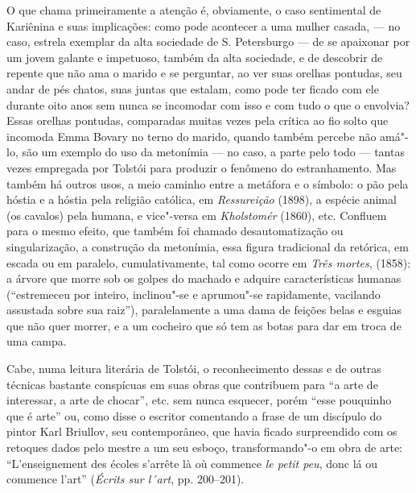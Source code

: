 O que chama primeiramente a atenção é, obviamente, o caso sentimental de
Kariênina e suas implicações: como pode acontecer a uma mulher
casada, --- no caso, estrela exemplar da alta sociedade de S.
Petersburgo --- de se apaixonar por um jovem galante e impetuoso, também
da alta sociedade, e de descobrir de repente que não ama o marido e se
perguntar, ao ver suas orelhas pontudas, seu andar de pés chatos, suas
juntas que estalam, como pode ter ficado com ele durante oito anos sem
nunca se incomodar com isso e com tudo o que o envolvia? Essas orelhas
pontudas, comparadas muitas vezes pela crítica ao fio solto que incomoda
Emma Bovary no terno do marido, quando também percebe não amá"-lo, são um
exemplo do uso da metonímia --- no caso, a parte pelo todo --- tantas
vezes empregada por Tolstói para produzir o fenômeno do estranhamento.
Mas também há outros usos, a meio caminho entre a metáfora e o símbolo:
o pão pela hóstia e a hóstia pela religião católica,
em \emph{Ressureição} (1898), a espécie animal (os cavalos) pela
humana, e vice"-versa em \emph{Kholstomér} (1860), etc. Confluem para o
mesmo efeito, que também foi chamado desautomatização ou
singularização, a construção da metonímia, essa figura tradicional da
retórica, em escada ou em paralelo, cumulativamente, tal como
ocorre em \emph{Três mortes}, (1858): a árvore que morre sob os golpes
do machado e adquire características humanas (``estremeceu por
inteiro, inclinou"-se e aprumou"-se rapidamente, vacilando assustada sobre
sua raiz''), paralelamente a uma dama de feições belas e esguias que
não quer morrer, e a um cocheiro que só tem as botas para dar em troca
de uma campa.

Cabe, numa leitura literária de Tolstói, o reconhecimento dessas e de
outras técnicas bastante conspícuas em suas obras que contribuem para
``a arte de interessar, a arte de chocar'', etc. sem nunca esquecer,
porém ``esse pouquinho que é arte'' ou, como disse o escritor
comentando a frase de um discípulo do pintor Karl Briullov, seu
contemporâneo, que havia ficado surpreendido com os retoques dados pelo
mestre a um seu esboço, transformando"-o em obra de arte:
``L'enseignement des écoles s'arrête là où commence \emph{le petit
peu}, donc lá ou commence l'art'' (\emph{Écrits sur l´art}, pp.
200--201).

